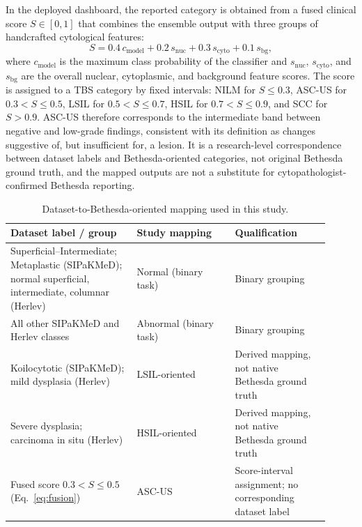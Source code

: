 \documentclass[runningheads]{llncs}
\begin{document}
In the deployed dashboard, the reported category is obtained from a fused clinical score $S \in [0,1]$ that combines the ensemble output with three groups of handcrafted cytological features:
\begin{equation}
    S = 0.4\,c_{\text{model}} + 0.2\,s_{\text{nuc}} + 0.3\,s_{\text{cyto}} + 0.1\,s_{\text{bg}},
    \label{eq:fusion}
\end{equation}
where $c_{\text{model}}$ is the maximum class probability of the classifier and $s_{\text{nuc}}$, $s_{\text{cyto}}$, and $s_{\text{bg}}$ are the overall nuclear, cytoplasmic, and background feature scores. The score is assigned to a TBS category by fixed intervals: NILM for $S \le 0.3$, ASC-US for $0.3 < S \le 0.5$, LSIL for $0.5 < S \le 0.7$, HSIL for $0.7 < S \le 0.9$, and SCC for $S > 0.9$. ASC-US therefore corresponds to the intermediate band between negative and low-grade findings, consistent with its definition as changes suggestive of, but insufficient for, a lesion. It is a research-level correspondence between dataset labels and Bethesda-oriented categories, not original Bethesda ground truth, and the mapped outputs are not a substitute for cytopathologist-confirmed Bethesda reporting.

\begin{table}[t]
\centering
\caption{Dataset-to-Bethesda-oriented mapping used in this study.}
\label{tab:bethesda}
\begin{tabular}{p{0.36\linewidth}p{0.28\linewidth}p{0.27\linewidth}}
\toprule
\textbf{Dataset label / group} & \textbf{Study mapping} & \textbf{Qualification}\\
\midrule
Superficial--Intermediate; Metaplastic (SIPaKMeD); normal superficial, intermediate, columnar (Herlev) & Normal (binary task) & Binary grouping\\
All other SIPaKMeD and Herlev classes & Abnormal (binary task) & Binary grouping\\
Koilocytotic (SIPaKMeD); mild dysplasia (Herlev) & LSIL-oriented & Derived mapping, not native Bethesda ground truth\\
Severe dysplasia; carcinoma in situ (Herlev) & HSIL-oriented & Derived mapping, not native Bethesda ground truth\\
Fused score $0.3 < S \le 0.5$ (Eq.~\ref{eq:fusion}) & ASC-US & Score-interval assignment; no corresponding dataset label\\
\bottomrule
\end{tabular}
\end{table}
\end{document}
